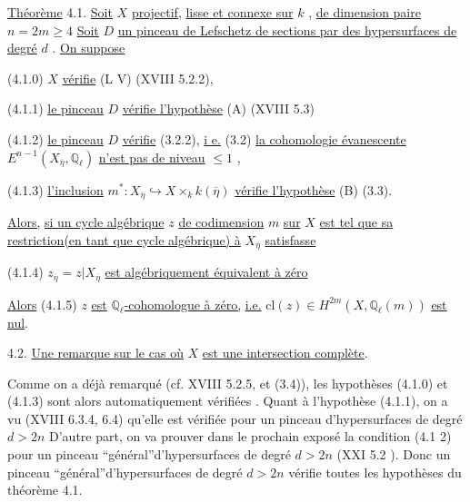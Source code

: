 \underline{Théorème} 4.1. \underline{Soit} $X$ \underline{projectif,} \underline{lisse et connexe sur} $k$ , \underline{de dimension paire} $n = 2m \geq 4$ \underline{Soit} $D$ \underline{un pinceau de Lefschetz de sections par des hypersurfaces de degré} $d$ . \underline{On suppose}

(4.1.0) $X$ \underline{vérifie} (L V) (XVIII 5.2.2),

(4.1.1) \underline{le pinceau} $D$ \underline{vérifie l'hypothèse} (A) (XVIII 5.3)

(4.1.2) \underline{le pinceau} $D$ \underline{vérifie} (3.2.2), \underline{i e.} (3.2) \underline{la cohomologie évanescente} $E^{n-1}(X_{\overline{\eta}},\mathbb{Q}_{\ell})$ \underline{n'est pas  de niveau} $\leq 1$ ,

(4.1.3) \underline{l'inclusion} $m^* : X_{\overline{\eta}} \hookrightarrow X \times_{k} k(\overline{\eta})$ \underline{vérifie l'hypothèse} (B) (3.3).

\underline{Alors,} \underline{si un cycle algébrique} $z$ \underline{de codimension} $m$ \underline{sur} $X$ \underline{est tel que sa restriction(en tant que cycle algébrique) à} $X_{\overline{\eta}}$ \underline{satisfasse}

(4.1.4) $z_{\overline{\eta}} = z|X_{\overline{\eta}}$ \underline{est algébriquement équivalent à zéro}

\underline{Alors} (4.1.5) $z$ \underline{est} \underline{$\mathbb{Q}_{\ell}$-cohomologue à zéro,} \underline{i.e.} $\mathrm{cl}(z) \in H^{2m}(X,\mathbb{Q}_{\ell}(m))$ \underline{est nul}.


4.2. \underline{Une remarque sur le cas où} $X$ \underline{est une intersection complète}.

Comme on a déjà remarqué (cf. XVIII 5.2.5, et (3.4)),  les hypothèses (4.1.0) et (4.1.3) sont alors automatiquement vérifiées . Quant à l'hypothèse (4.1.1), on a vu (XVIII 6.3.4, 6.4) qu'elle est vérifiée pour un pinceau d'hypersurfaces de degré $d > 2n$  D'autre part, on va prouver dans le prochain exposé la condition (4.1 2) pour un pinceau ``général''d'hypersurfaces de degré $d > 2n$  (XXI 5.2 ). Donc un pinceau ``général''d'hypersurfaces de degré $d > 2n$  vérifie toutes les hypothèses du théorème 4.1.



